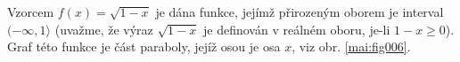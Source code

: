 \begin{mdframed}[style=mdexam]
  \begin{example}\label{mai:exam018} 
    Vzorcem $f(x)=\sqrt{1-x}$ je dána funkce, jejímž přirozeným oborem je interval 
    $(-\infty,1\rangle$ (uvažme, že výraz $\sqrt{1-x}$ je definován v reálném oboru, je-li 
    $1-x\geq0$). Graf této funkce je část paraboly, jejíž osou je osa \(x\), viz obr. 
    \ref{mai:fig006}.
    
    {\centering
    \captionsetup{type=figure}
    \label{mai:fig006}
    \par}
  \end{example}
\end{mdframed}